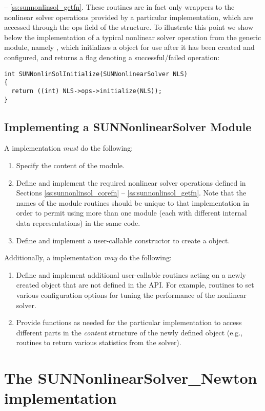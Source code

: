 -- \ref{ss:sunnonlinsol_getfn}. These routines are in fact only
wrappers to the nonlinear solver operations provided by a particular
{\sunnonlinsol} implementation, which are accessed through the ops
field of the  structure. To illustrate this
point we show below the implementation of a typical nonlinear solver
operation from the generic {\sunnonlinsol} module,
namely , which initializes a
{\sunnonlinsol} object for use after it has been created and
configured, and returns a flag denoting a successful/failed operation:
\begin{verbatim}
int SUNNonlinSolInitialize(SUNNonlinearSolver NLS)
{
  return ((int) NLS->ops->initialize(NLS));
}
\end{verbatim}


\subsection{Implementing a SUNNonlinearSolver Module}
\label{ss:sunnonlinsol_custom}

A {\sunnonlinsol} implementation \textit{must} do the following:
\begin{enumerate}
\item Specify the content of the {\sunnonlinsol} module.
\item Define and implement the required nonlinear solver operations
  defined in Sections \ref{ss:sunnonlinsol_corefn}
  -- \ref{ss:sunnonlinsol_getfn}. Note that the names of the module
  routines should be unique to that implementation in order to permit
  using more than one {\sunnonlinsol} module (each with different
   internal data representations) in
  the same code.
\item Define and implement a user-callable constructor to create a
   object.
\end{enumerate}
Additionally, a {\sunnonlinsol} implementation \textit{may} do the
following:
\begin{enumerate}
\item Define and implement additional user-callable routines acting on
  a newly created  object that are not defined
  in the {\sunnonlinsol} API. For example, routines to set various
  configuration options for tuning the performance of the nonlinear
  solver.
\item Provide functions as needed for the particular {\sunnonlinsol}
  implementation to access different parts in the {\em content}
  structure of the newly defined  object 
  (e.g., routines to return various statistics from the solver).
\end{enumerate}


\section{The SUNNonlinearSolver\_Newton implementation}\label{s:sunnonlinsol_newton}


